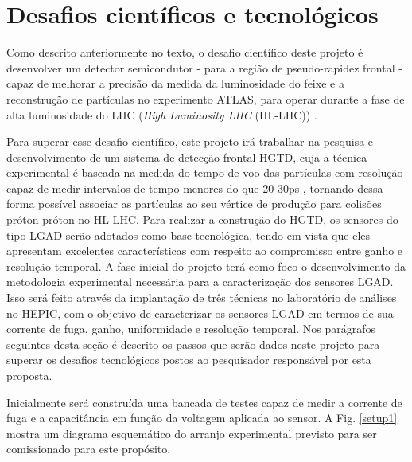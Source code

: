 \chapter{Desafios científicos e tecnológicos}

Como descrito anteriormente no texto, o desafio científico deste projeto é desenvolver um detector semicondutor - para a região de pseudo-rapidez frontal - capaz de melhorar a precisão da medida da luminosidade do feixe e a reconstrução de partículas no experimento ATLAS, para operar durante a fase de alta luminosidade do LHC ({\it High Luminosity LHC} (HL-LHC)) \cite{tdr}. 

Para superar esse desafio científico, este projeto irá trabalhar na pesquisa e desenvolvimento de um sistema de detecção frontal HGTD, cuja a técnica experimental é baseada na medida do tempo de voo das partículas com resolução capaz de medir intervalos de tempo menores do que 20-30ps \cite{tdr}, tornando dessa forma possível associar as partículas ao seu vértice de produção para colisões próton-próton no HL-LHC. Para realizar a construção do HGTD, os sensores do tipo LGAD serão adotados como base tecnológica, tendo em vista que eles apresentam excelentes características com respeito ao compromisso entre ganho e resolução temporal. 
A fase inicial do projeto terá como foco o desenvolvimento da metodologia experimental necessária para a caracterização dos sensores LGAD. Isso será feito através da implantação de três técnicas no laboratório de análises no HEPIC, com o objetivo de caracterizar os sensores LGAD em termos de sua corrente de fuga, ganho, uniformidade e resolução temporal. Nos parágrafos seguintes desta seção é descrito os passos que serão dados neste projeto para superar os desafios tecnológicos postos ao pesquisador responsável por esta proposta. 

Inicialmente será construída uma bancada de testes capaz de medir a corrente de fuga e a capacitância em função da voltagem aplicada ao sensor. A Fig. \ref{setup1} mostra um diagrama esquemático do arranjo experimental previsto para ser comissionado para este propósito.

